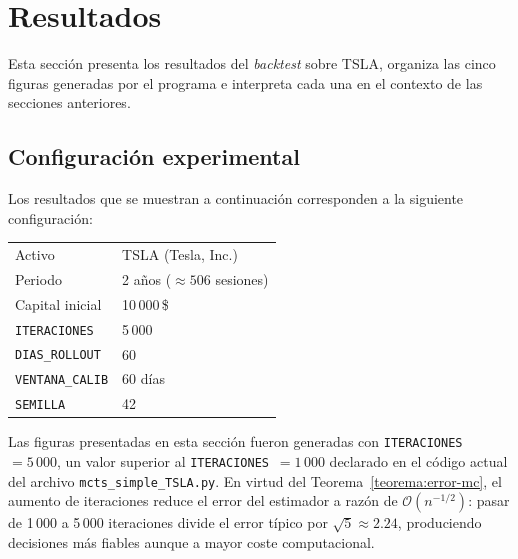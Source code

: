 \section{Resultados}
\label{sec:resultados}

Esta sección presenta los resultados del \emph{backtest} sobre TSLA, organiza las cinco figuras generadas por el programa e interpreta cada una en el contexto de las secciones anteriores.

\subsection{Configuración experimental}
\label{subsec:config-experimental}

Los resultados que se muestran a continuación corresponden a la siguiente configuración:

\begin{center}
\begin{tabular}{ll}
\toprule
Activo & TSLA (Tesla, Inc.) \\
Periodo & 2 años ($\approx 506$ sesiones) \\
Capital inicial & 10\,000\,\$ \\
\texttt{ITERACIONES} & 5\,000 \\
\texttt{DIAS\_ROLLOUT} & 60 \\
\texttt{VENTANA\_CALIB} & 60 días \\
\texttt{SEMILLA} & 42 \\
\bottomrule
\end{tabular}
\end{center}

\begin{observacion}
\label{obs:iteraciones}
Las figuras presentadas en esta sección fueron generadas con \texttt{ITERACIONES}~$= 5\,000$, un valor superior al \texttt{ITERACIONES}~$= 1\,000$ declarado en el código actual del archivo \texttt{mcts\_simple\_TSLA.py}. En virtud del Teorema~\ref{teorema:error-mc}, el aumento de iteraciones reduce el error del estimador a razón de $\mathcal{O}(n^{-1/2})$: pasar de 1\,000 a 5\,000 iteraciones divide el error típico por $\sqrt{5} \approx 2{.}24$, produciendo decisiones más fiables aunque a mayor coste computacional.
\end{observacion}

